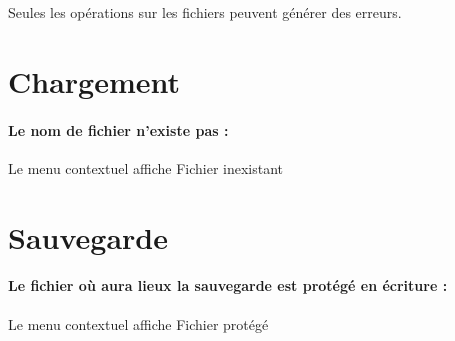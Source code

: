 Seules les opérations sur les fichiers peuvent générer des erreurs.

\section{Chargement}
\paragraph{Le nom de fichier n'existe pas :} Le menu contextuel affiche \og Fichier inexistant\fg

\section{Sauvegarde}
\paragraph{Le fichier où aura lieux la sauvegarde est protégé en écriture :} Le menu contextuel affiche \og Fichier protégé\fg

